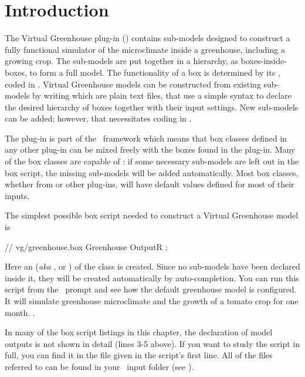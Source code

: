 \section{Introduction}
The Virtual Greenhouse plug-in () contains sub-models designed to construct a fully functional simulator of the microclimate inside a greenhouse, including a growing crop. The sub-models are put together in a hierarchy, as boxes-inside-boxes, to form a full model. The functionality of a box is determined by its , coded in \CPP. Virtual Greenhouse models can be constructed from existing sub-models by writing  which are plain text files, that use a simple syntax to declare the desired hierarchy of boxes together with their input settings. New sub-models can be added; however, that necessitates coding in \CPP.

The  plug-in is part of the \US\ framework which means that box classes defined in any other plug-in can be  mixed freely with the boxes found in the  plug-in. Many of the  box classes are capable of : if some necessary sub-models are left out in the box script, the missing sub-models will be added automatically. Most box classes, whether from  or other plug-ins, will have default values defined for most of their inputs.

The simplest possible box script needed to construct a Virtual Greenhouse model is
\lstset{numbers=left}
\begin{boxscript}
// vg/greenhouse.box
Greenhouse {
	OutputR {
	:
	}
}
\end{boxscript}
\lstset{numbers=none}

Here an  (\emph{aka} ,  or ) of the class  is created. Since no sub-models have been declared inside it, they will be created automatically by auto-completion. You can run this script from the \US\ prompt and see how the default greenhouse model is configured. It will simulate greenhouse microclimate and the growth of a tomato crop for one month. .

In many of the box script listings in this chapter, the declaration of model outputs is not shown in detail (lines 3-5 above). If you want to study the script in full, you can find it in the file given in the script's first line. All of the files referred to can be found in your \US\ input folder (see ).

